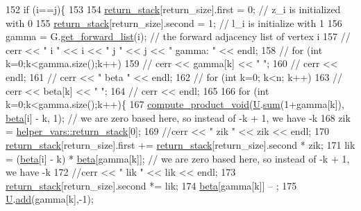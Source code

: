 \begin{DoxyCode}
152     \textcolor{keywordflow}{if} (i==j)\{
153 
154       \hyperlink{namespacehelper__vars_a6d2100c373830cacd232319a9958652d}{return\_stack}[return\_size].first = 0; \textcolor{comment}{// z\_i is initialized with 0}
155       \hyperlink{namespacehelper__vars_a6d2100c373830cacd232319a9958652d}{return\_stack}[return\_size].second = 1; \textcolor{comment}{// l\_i is initialize with 1}
156       gamma = G.\hyperlink{classgraph_aa8fbee52a7b3604dbbd9175040c7ead5}{get\_forward\_list}(i); \textcolor{comment}{// the forward adjacency list of vertex i}
157       \textcolor{comment}{// cerr << " i " << i << " j " << j << " gamma: " << endl;}
158       \textcolor{comment}{// for (int k=0;k<gamma.size();k++)}
159       \textcolor{comment}{//   cerr << gamma[k] << " ";}
160       \textcolor{comment}{// cerr << endl;}
161       \textcolor{comment}{// cerr << " beta " << endl;}
162       \textcolor{comment}{// for (int k=0; k<n; k++)}
163       \textcolor{comment}{//   cerr << beta[k] << " ";}
164       \textcolor{comment}{// cerr << endl;}
165 
166       \textcolor{keywordflow}{for} (\textcolor{keywordtype}{int} k=0;k<gamma.size();k++)\{
167         \hyperlink{compression__helper_8cpp_af75857c18e9c23bb114e12642aa8c067}{compute\_product\_void}(\hyperlink{classgraph__encoder_a3314c40920f2ee132958a6b0ce7e7995}{U}.\hyperlink{classreverse__fenwick__tree_a672731fd6395b4853430073a099a80e6}{sum}(1+gamma[k]), \hyperlink{classgraph__encoder_a40880adecfd63fb86e94b4b0fc3f6bc2}{beta}[i] - k, 1); \textcolor{comment}{// we are zero
       based here, so instead of -k + 1, we have -k}
168         zik = \hyperlink{namespacehelper__vars_a6d2100c373830cacd232319a9958652d}{helper\_vars::return\_stack}[0];
169         \textcolor{comment}{//cerr << " zik " << zik << endl;}
170         \hyperlink{namespacehelper__vars_a6d2100c373830cacd232319a9958652d}{return\_stack}[return\_size].first += \hyperlink{namespacehelper__vars_a6d2100c373830cacd232319a9958652d}{return\_stack}[return\_size].second * zik;
171         lik = (\hyperlink{classgraph__encoder_a40880adecfd63fb86e94b4b0fc3f6bc2}{beta}[i] - k) * \hyperlink{classgraph__encoder_a40880adecfd63fb86e94b4b0fc3f6bc2}{beta}[gamma[k]]; \textcolor{comment}{// we are zero based here, so instead of -k + 1, we
       have -k}
172         \textcolor{comment}{//cerr << " lik " << lik << endl;}
173         \hyperlink{namespacehelper__vars_a6d2100c373830cacd232319a9958652d}{return\_stack}[return\_size].second *= lik;
174         \hyperlink{classgraph__encoder_a40880adecfd63fb86e94b4b0fc3f6bc2}{beta}[gamma[k]] -- ;
175         \hyperlink{classgraph__encoder_a3314c40920f2ee132958a6b0ce7e7995}{U}.\hyperlink{classreverse__fenwick__tree_a942d7f49b37e53ebfec3076d177691d7}{add}(gamma[k],-1);

\end{DoxyCode}
